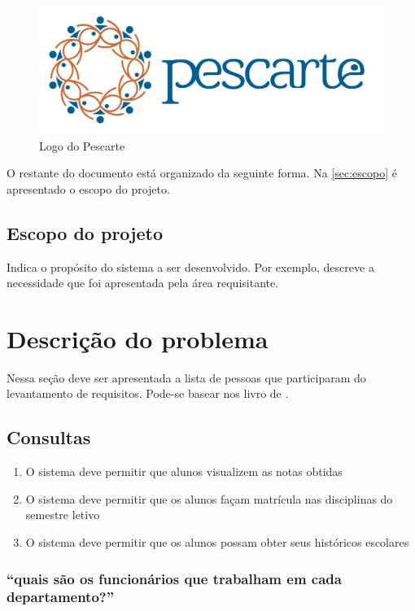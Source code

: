 \documentclass[11pt]{../../classes/ifscarticle}
\begin{document}
\begin{figure}[ht]
    \centering
    \includegraphics[width=.5\linewidth]{figuras/logoPescarte}
    \caption{Logo do Pescarte}
    \label{fig:logolatex}
\end{figure}

O restante do documento está organizado da seguinte forma. Na \autoref{sec:escopo} é apresentado o escopo do projeto.

\subsection{Escopo do projeto}
\label{sec:escopo}

Indica o propósito do sistema a ser desenvolvido. Por exemplo, descreve a necessidade que foi apresentada pela área requisitante. \lipsum[2]


\section{Descrição do problema}


Nessa seção deve ser apresentada a lista de pessoas que participaram do levantamento de requisitos. Pode-se basear nos livro de \cite{bezerra02}.

\lipsum[2]


\subsection{Consultas}

\begin{enumerate}
    \item O sistema deve permitir que alunos visualizem as notas obtidas
    \item O sistema deve permitir que os alunos façam matrícula nas disciplinas do semestre letivo
    \item O sistema deve permitir que os alunos possam obter seus históricos escolares
\end{enumerate}

\subsubsection{“quais são os funcionários que trabalham em cada departamento?”}
\end{document}
